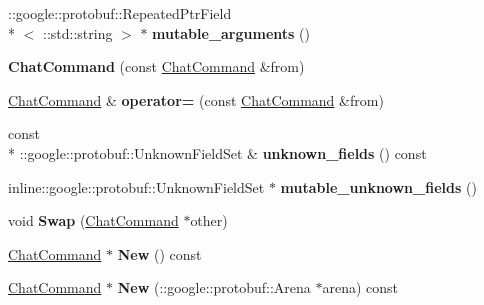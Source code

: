 \begin{DoxyCompactItemize}
\item 
\hypertarget{classSimpleChat_1_1ChatCommand_a57434b9f127e427af3bf90d22376d1a6}{\-::google\-::protobuf\-::\-Repeated\-Ptr\-Field\\*
$<$ \-::std\-::string $>$ $\ast$ {\bfseries mutable\-\_\-arguments} ()}\label{classSimpleChat_1_1ChatCommand_a57434b9f127e427af3bf90d22376d1a6}

\item 
\hypertarget{classSimpleChat_1_1ChatCommand_aa16520371fefabad5f42be66c2166115}{{\bfseries Chat\-Command} (const \hyperlink{classSimpleChat_1_1ChatCommand}{Chat\-Command} \&from)}\label{classSimpleChat_1_1ChatCommand_aa16520371fefabad5f42be66c2166115}

\item 
\hypertarget{classSimpleChat_1_1ChatCommand_a7c066b1b1e8df8fa4cbdcada306b5131}{\hyperlink{classSimpleChat_1_1ChatCommand}{Chat\-Command} \& {\bfseries operator=} (const \hyperlink{classSimpleChat_1_1ChatCommand}{Chat\-Command} \&from)}\label{classSimpleChat_1_1ChatCommand_a7c066b1b1e8df8fa4cbdcada306b5131}

\item 
\hypertarget{classSimpleChat_1_1ChatCommand_afc3fdc2a7378b379d0b1b5bd96c15b84}{const \\*
\-::google\-::protobuf\-::\-Unknown\-Field\-Set \& {\bfseries unknown\-\_\-fields} () const }\label{classSimpleChat_1_1ChatCommand_afc3fdc2a7378b379d0b1b5bd96c15b84}

\item 
\hypertarget{classSimpleChat_1_1ChatCommand_aab03f63fc0707e0f99354f22ba7d24a9}{inline\-::google\-::protobuf\-::\-Unknown\-Field\-Set $\ast$ {\bfseries mutable\-\_\-unknown\-\_\-fields} ()}\label{classSimpleChat_1_1ChatCommand_aab03f63fc0707e0f99354f22ba7d24a9}

\item 
\hypertarget{classSimpleChat_1_1ChatCommand_a089731c3f481fc59720de75bb57d0453}{void {\bfseries Swap} (\hyperlink{classSimpleChat_1_1ChatCommand}{Chat\-Command} $\ast$other)}\label{classSimpleChat_1_1ChatCommand_a089731c3f481fc59720de75bb57d0453}

\item 
\hypertarget{classSimpleChat_1_1ChatCommand_abd47580fa1ed63285ff861c67bac13d7}{\hyperlink{classSimpleChat_1_1ChatCommand}{Chat\-Command} $\ast$ {\bfseries New} () const }\label{classSimpleChat_1_1ChatCommand_abd47580fa1ed63285ff861c67bac13d7}

\item 
\hypertarget{classSimpleChat_1_1ChatCommand_a4a1aaeaf97d2027fcb439262a6fa2641}{\hyperlink{classSimpleChat_1_1ChatCommand}{Chat\-Command} $\ast$ {\bfseries New} (\-::google\-::protobuf\-::\-Arena $\ast$arena) const }\label{classSimpleChat_1_1ChatCommand_a4a1aaeaf97d2027fcb439262a6fa2641}


\end{DoxyCompactItemize}
